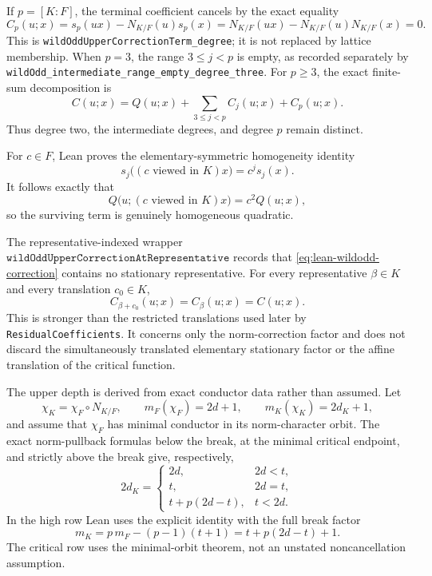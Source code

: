 \begin{lemma}
If $p=[K:F]$, the terminal coefficient cancels by the exact equality
\begin{equation}\label{eq:lean-wildodd-endpoint-cancellation}
 C_p(u;x)=s_p(ux)-N_{K/F}(u)s_p(x)
 =N_{K/F}(ux)-N_{K/F}(u)N_{K/F}(x)=0.
\end{equation}
This is \texttt{wildOddUpperCorrectionTerm\_degree}; it is not replaced
by lattice membership.  When $p=3$, the range $3\le j<p$ is empty, as
recorded separately by
\texttt{wildOdd\_intermediate\_range\_empty\_degree\_three}.  For
$p\ge3$, the exact finite-sum decomposition is
\begin{equation}\label{eq:lean-wildodd-correction-decomposition}
 C(u;x)=Q(u;x)+\sum_{3\le j<p}C_j(u;x)+C_p(u;x).
\end{equation}
Thus degree two, the intermediate degrees, and degree $p$ remain distinct.

For $c\in F$, Lean proves the elementary-symmetric homogeneity identity
\begin{equation}\label{eq:lean-wildodd-esymm-homogeneous}
 s_j\bigl((c\text{ viewed in }K)x\bigr)=c^j s_j(x).
\end{equation}
It follows exactly that
\begin{equation}\label{eq:lean-wildodd-quadratic-homogeneous}
 Q\bigl(u;(c\text{ viewed in }K)x\bigr)=c^2Q(u;x),
\end{equation}
so the surviving term is genuinely homogeneous quadratic.

The representative-indexed wrapper
$\texttt{wildOddUpperCorrectionAtRepresentative}$ records that
\eqref{eq:lean-wildodd-correction} contains no stationary representative.
For every representative $\beta\in K$ and every translation $c_0\in K$,
\begin{equation}\label{eq:lean-wildodd-representative-translation}
 C_{\beta+c_0}(u;x)=C_\beta(u;x)=C(u;x).
\end{equation}
This is stronger than the restricted translations used later by
\texttt{ResidualCoefficients}.  It concerns only the norm-correction
factor and does not discard the simultaneously translated elementary
stationary factor or the affine translation of the critical function.

The upper depth is derived from exact conductor data rather than assumed.
Let
\[
 \chi_K=\chi_F\circ N_{K/F},\qquad
 m_F(\chi_F)=2d+1,\qquad m_K(\chi_K)=2d_K+1,
\]
and assume that $\chi_F$ has minimal conductor in its norm-character
orbit.  The exact norm-pullback formulas below the break, at the minimal
critical endpoint, and strictly above the break give, respectively,
\begin{equation}\label{eq:lean-wildodd-conductor-depth-cases}
 2d_K=
 \begin{cases}
  2d,&2d<t,\\
  t,&2d=t,\\
  t+p(2d-t),&t<2d.
 \end{cases}
\end{equation}
In the high row Lean uses the explicit identity with the full break factor
\[
 m_K=p\,m_F-(p-1)(t+1)=t+p(2d-t)+1.
\]
The critical row uses the minimal-orbit theorem, not an unstated
noncancellation assumption.


\end{lemma}
